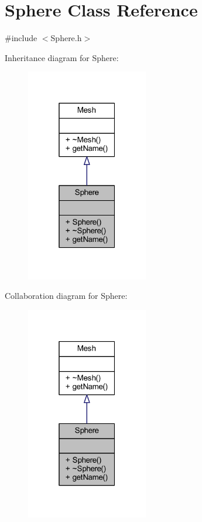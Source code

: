 \hypertarget{class_sphere}{}\section{Sphere Class Reference}
\label{class_sphere}


{\ttfamily \#include $<$Sphere.\+h$>$}



Inheritance diagram for Sphere\+:
\nopagebreak
\begin{figure}[H]
\begin{center}
\leavevmode
\includegraphics[width=151pt]{class_sphere__inherit__graph}
\end{center}
\end{figure}


Collaboration diagram for Sphere\+:
\nopagebreak
\begin{figure}[H]
\begin{center}
\leavevmode
\includegraphics[width=151pt]{class_sphere__coll__graph}
\end{center}
\end{figure}
